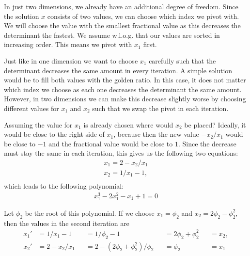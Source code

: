 \documentclass[english,version-2020-11]{uzl-thesis}
\begin{document}
In just two dimensions, we already have an additional degree of freedom.
Since the solution $x$ consists of two values, we can choose which index we pivot with.
We will choose the value with the smallest fractional value as this decreases
the determinant the fastest.
We assume w.l.o.g. that our values are sorted in increasing order.
This means we pivot with $x_1$ first.

Just like in one dimension we want to choose $x_1$ carefully such that the
determinant decreases the same amount in every iteration.
A simple solution would be to fill both values with the golden ratio.
In this case, it does not matter which index we choose as each one decreases
the determinant the same amount.
However, in two dimensions we can make this decrease slightly worse
by choosing different values for $x_1$ and $x_2$ such that we swap the pivot
in each iteration.

Assuming the value for $x_1$ is already chosen where would $x_2$ be placed?
Ideally, it would be close to the right side of $x_1$, because then the new
value $-x_2 / x_1$ would be close to $-1$ and the fractional value would be
close to $1$.
Since the decrease must stay the same in each iteration, this gives us the
following two equations:
\begin{align*}
  x_1 = 2 - x_2 / x_1 \\
  x_2 = 1 / x_1 - 1,\\
\end{align*}
which leads to the following polynomial:
\begin{align*}
  x_1^3 - 2x_1^2 - x_1 + 1 = 0
\end{align*}

Let $\phi_2$ be the root of this polynomial.
If we choose $x_1 = \phi_2$ and $x_2 = 2\phi_2 - \phi_2^2$,
then the values in the second iteration are
\[\begin{aligned}
  x_1' & = 1 / x_1 - 1   &  & = 1 / \phi_2 - 1                    &  & = 2\phi_2 + \phi_2^2 &  & = x_2, \\
  x_2' & = 2 - x_2 / x_1 &  & = 2 - (2\phi_2 + \phi_2^2) / \phi_2 &  & = \phi_2             &  & = x_1
\end{aligned}\]
\end{document}
